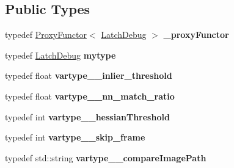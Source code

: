 \subsection*{Public Types}
\begin{DoxyCompactItemize}
\item 
\mbox{\label{classfilter_1_1algos_1_1_latch_debug_aa95fbf4249edae72ddaa90e60f3344a5}} 
typedef \hyperlink{class_proxy_functor}{Proxy\+Functor}$<$ \hyperlink{classfilter_1_1algos_1_1_latch_debug}{Latch\+Debug} $>$ {\bfseries \+\_\+proxy\+Functor}
\item 
\mbox{\label{classfilter_1_1algos_1_1_latch_debug_a2c13bb4c70a80d557e129c9c91578723}} 
typedef \hyperlink{classfilter_1_1algos_1_1_latch_debug}{Latch\+Debug} {\bfseries mytype}
\item 
\mbox{\label{classfilter_1_1algos_1_1_latch_debug_ac44e069fb151e11bbd2ad62ce7f6fbb1}} 
typedef float {\bfseries vartype\+\_\+\+\_\+inlier\+\_\+threshold}
\item 
\mbox{\label{classfilter_1_1algos_1_1_latch_debug_a15315757ada7bbb715450d68c19eb7e9}} 
typedef float {\bfseries vartype\+\_\+\+\_\+nn\+\_\+match\+\_\+ratio}
\item 
\mbox{\label{classfilter_1_1algos_1_1_latch_debug_a5ed38c9d4abe33f95b4b438ab27c8820}} 
typedef int {\bfseries vartype\+\_\+\+\_\+hessian\+Threshold}
\item 
\mbox{\label{classfilter_1_1algos_1_1_latch_debug_a40086693769d33e80f80b1ff478e34c3}} 
typedef int {\bfseries vartype\+\_\+\+\_\+skip\+\_\+frame}
\item 
\mbox{\label{classfilter_1_1algos_1_1_latch_debug_ada3d95cff20f897be07b9f6aa482cfde}} 
typedef std\+::string {\bfseries vartype\+\_\+\+\_\+compare\+Image\+Path}
\end{DoxyCompactItemize}
